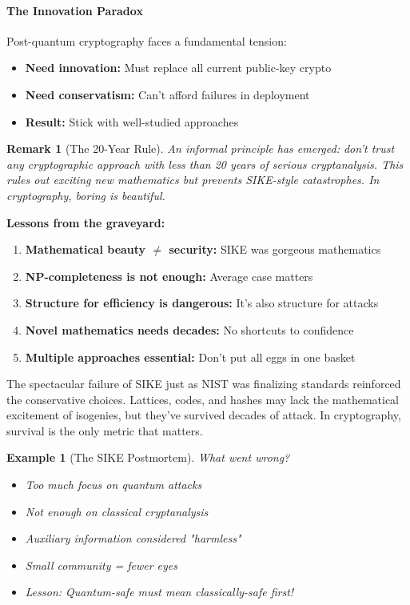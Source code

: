 \documentclass[11pt,a4paper]{article}
\newtheorem{example}{Example}
\newtheorem{remark}{Remark}
\begin{document}
\paragraph{The Innovation Paradox}

Post-quantum cryptography faces a fundamental tension:

\begin{itemize}
    \item \textbf{Need innovation:} Must replace all current public-key crypto
    \item \textbf{Need conservatism:} Can't afford failures in deployment
    \item \textbf{Result:} Stick with well-studied approaches
\end{itemize}

\begin{remark}[The 20-Year Rule]
An informal principle has emerged: don't trust any cryptographic approach with less than 20 years of serious cryptanalysis. This rules out exciting new mathematics but prevents SIKE-style catastrophes. In cryptography, boring is beautiful.
\end{remark}

\textbf{Lessons from the graveyard:}
\begin{enumerate}
    \item \textbf{Mathematical beauty $\neq$ security:} SIKE was gorgeous mathematics
    \item \textbf{NP-completeness is not enough:} Average case matters
    \item \textbf{Structure for efficiency is dangerous:} It's also structure for attacks
    \item \textbf{Novel mathematics needs decades:} No shortcuts to confidence
    \item \textbf{Multiple approaches essential:} Don't put all eggs in one basket
\end{enumerate}

The spectacular failure of SIKE just as NIST was finalizing standards reinforced the conservative choices. Lattices, codes, and hashes may lack the mathematical excitement of isogenies, but they've survived decades of attack. In cryptography, survival is the only metric that matters.

\begin{example}[The SIKE Postmortem]
What went wrong?
\begin{itemize}
    \item Too much focus on quantum attacks
    \item Not enough on classical cryptanalysis
    \item Auxiliary information considered "harmless"
    \item Small community = fewer eyes
    \item Lesson: Quantum-safe must mean classically-safe first!
\end{itemize}
\end{example}
\end{document}
